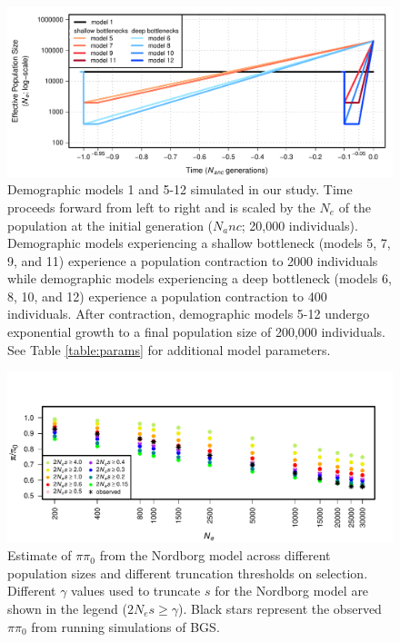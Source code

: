 \documentclass[9pt,twocolumn,twoside]{rilabRxiv}
\begin{document}
\begin{figure}[h!]
\includegraphics[width=.9\linewidth]{figures/FigS2.pdf}
\caption{Demographic models 1 and 5-12 simulated in our study.
Time proceeds forward from left to right and is scaled by the $N_e$ of the population at the initial generation ($N_anc$; 20,000 individuals).
Demographic models experiencing a shallow bottleneck (models 5, 7, 9, and 11) experience a population contraction to 2000 individuals while demographic models experiencing a deep bottleneck (models 6, 8, 10, and 12) experience a population contraction to 400 individuals.
After contraction, demographic models 5-12 undergo exponential growth to a final population size of 200,000 individuals.
See Table \ref{table:params} for additional model parameters.}
\label{fig:S2}
\end{figure}
\pagebreak

\begin{figure}[h!]
\includegraphics[width=.9\linewidth]{figures/FigS21.pdf}
\caption{Estimate of $\pi\pi_0$ from the Nordborg model across different population sizes and different truncation thresholds on selection.
Different $\gamma$ values used to truncate $s$ for the Nordborg model are shown in the legend ($2N_es \geq \gamma$).
Black stars represent the observed $\pi\pi_0$ from running simulations of BGS.}
\label{fig:nordborgsims}
\end{figure}
\pagebreak

\end{document}
